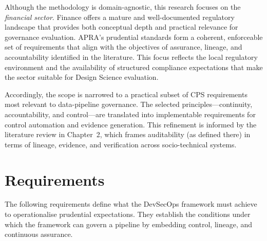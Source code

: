 Although the methodology is domain-agnostic, this research focuses on the
\textit{financial sector}. Finance offers a mature and well-documented
regulatory landscape that provides both conceptual depth and practical
relevance for governance evaluation. APRA’s prudential standards form a
coherent, enforceable set of requirements that align with the objectives of
assurance, lineage, and accountability identified in the literature. This focus
reflects the local regulatory environment and the availability of structured
compliance expectations that make the sector suitable for Design Science
evaluation.

Accordingly, the scope is narrowed to a practical subset of CPS requirements
most relevant to data-pipeline governance. The selected principles—continuity,
accountability, and control—are translated into implementable requirements for
control automation and evidence generation. This refinement is informed by the
literature review in Chapter~2, which frames auditability (as defined there) in
terms of lineage, evidence, and verification across socio-technical systems.

\section{Requirements}
\noindent
The following requirements define what the DevSecOps framework must achieve to
operationalise prudential expectations. They establish the conditions under
which the framework can govern a pipeline by embedding control, lineage, and
continuous assurance.

